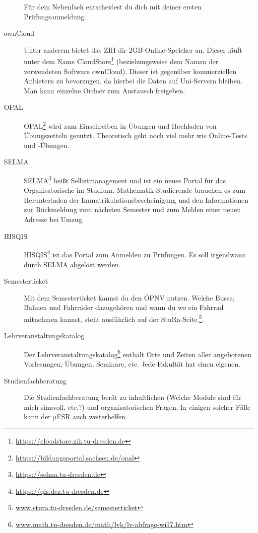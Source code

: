 \documentclass{scrartcl}
\begin{document}
\begin{description}
    Für dein Nebenfach entscheidest du dich mit deiner ersten
    Prüfungsanmeldung.
  \item[ownCloud] Unter anderem bietet das ZIH dir 2GB Online-Speicher an.
    Dieser läuft unter dem Name CloudStore\footnote{\url{https://cloudstore.zih.tu-dresden.de}} (beziehungsweise dem Namen der verwendeten Software ownCloud).
    Dieser ist gegenüber kommerziellen Anbietern zu bevorzugen,
    da hierbei die Daten auf Uni-Servern bleiben. Man kann einzelne Ordner zum Austausch freigeben.
  \item[OPAL] OPAL\footnote{\url{https://bildungsportal.sachsen.de/opal}} wird zum Einschreiben in Übungen und Hochladen von Übungszetteln genutzt. Theoretisch geht noch viel mehr
    wie Online-Tests und -Übungen.
  \item[SELMA] SELMA\footnote{\url{https://selma.tu-dresden.de}} heißt Selbstmanagement und ist ein neues Portal für das Organisatorische
    im Studium. Mathematik-Studierende brauchen es zum Herunterladen der Immatrikulationsbescheinigung
    und den Informationen zur Rückmeldung zum nächsten Semester und zum Melden einer neuen Adresse bei Umzug.
  \item[HISQIS] HISQIS\footnote{\url{https://qis.dez.tu-dresden.de}} ist das Portal zum Anmelden zu Prüfungen. Es soll irgendwann durch SELMA abgelöst werden.
  \item[Semesterticket] Mit dem Semesterticket kannst du den ÖPNV nutzen. Welche Busse, Bahnen und Fahrräder dazugehören und wann du wo ein Fahrrad mitnehmen kannst,
    steht ausführlich auf der StuRa-Seite.\footnote{\url{www.stura.tu-dresden.de/semesterticket}}.
  \item[Lehrveranstaltungskatalog] Der Lehrveranstaltungskatalog\footnote{\url{www.math.tu-dresden.de/math/lvk/lv-abfrage-wi17.htm}} enthält Orte und Zeiten aller angebotenen
    Vorlesungen, Übungen, Seminare, etc. Jede Fakultät hat einen eigenen.
  \item[Studienfachberatung] Die Studienfachberatung berät zu
    inhaltlichen (Welche Module sind für mich sinnvoll, etc.?)
    und organisatorischen Fragen.
    In einigen solcher Fälle kann der μFSR auch weiterhelfen.


\end{description}
\end{document}
